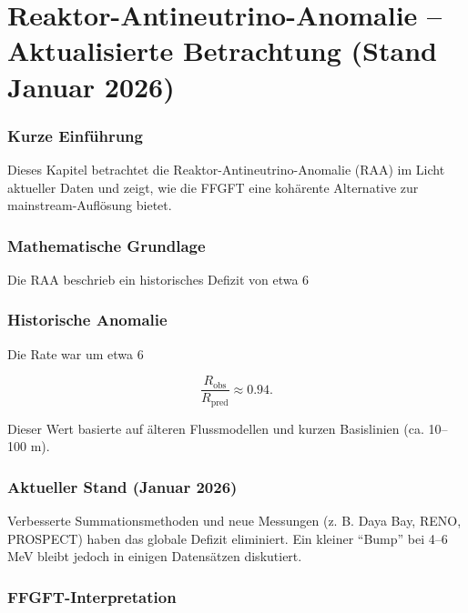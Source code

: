 \chapter{Reaktor-Antineutrino-Anomalie – Aktualisierte Betrachtung (Stand Januar 2026)}


	
	\subsection*{Kurze Einführung}
	
	Dieses Kapitel betrachtet die Reaktor-Antineutrino-Anomalie (RAA) im Licht aktueller Daten und zeigt, wie die FFGFT eine kohärente Alternative zur mainstream-Auflösung bietet.
	
	\subsection*{Mathematische Grundlage}
	
	Die RAA beschrieb ein historisches Defizit von etwa 6 %
	
	\subsection*{Historische Anomalie}
	
	Die Rate war um etwa 6 %
	
	\begin{equation}
		\frac{R_{\text{obs}}}{R_{\text{pred}}} \approx 0.94.
	\end{equation}
	
	Dieser Wert basierte auf älteren Flussmodellen und kurzen Basislinien (ca. 10–100 m).
	
	\subsection*{Aktueller Stand (Januar 2026)}
	
	Verbesserte Summationsmethoden und neue Messungen (z. B. Daya Bay, RENO, PROSPECT) haben das globale Defizit eliminiert. Ein kleiner \enquote{Bump} bei 4–6 MeV bleibt jedoch in einigen Datensätzen diskutiert.
	
	\subsection*{FFGFT-Interpretation}
	
